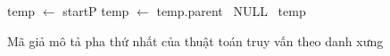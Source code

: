 \begin{figure}[htbp]
	\vspace*{-\baselineskip}
	\begin{algorithm}[H]
		\footnotesize
		\caption{FindAncestor(startP, dA)}
		\begin{algorithmic}[1]
			\State temp $\gets$ startP
			\State temp $\gets$ temp.parent
			\Else \ \Return NULL 
			\EndIf
			\EndFor
			\State\ \Return temp
		\end{algorithmic}
	\end{algorithm}
	\vspace*{-\baselineskip}
	\caption{Mã giả mô tả pha thứ nhất của thuật toán truy vấn theo danh xưng}
	\vspace*{-\baselineskip}
\end{figure}
